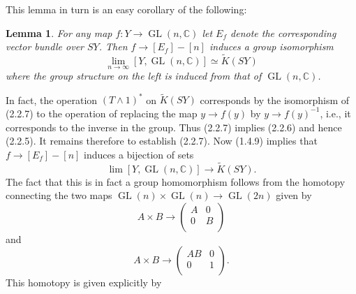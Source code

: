 \documentclass[leqno]{book}
\numberwithin{equation}{section}
\newtheorem{lemma}[theorem]{Lemma}
\theoremstyle{definition}
\begin{document}
            This lemma in turn is an easy corollary of the following:
            \begin{lemma}
              For any map $f:Y\to \operatorname{GL}(n,\mathbb{C})$ let $E_{f}$ denote the corresponding vector bundle over $SY$. Then $f\to [E_{f}]-[n]$ induces a group isomorphism
              \begin{equation*}
                \lim_{n \to \infty}[Y,\operatorname{GL}(n,\mathbb{C})]\simeq \tilde{K}(SY)
              \end{equation*}
              where the group structure on the left is induced from that of $\operatorname{GL}(n,\mathbb{C})$.
            \end{lemma}

            In fact, the operation $(T\wedge 1)^{*}$ on $\tilde{K}(SY)$ corresponds by the isomorphism of (2.2.7) to the operation of replacing the map $y\to f(y)$ by $y\to f(y)^{-1}$, i.e., it corresponds to the inverse in the group. Thus (2.2.7) implies (2.2.6) and hence (2.2.5). It remains therefore to establish (2.2.7). Now (1.4.9) implies that $f\to [E_{f}]-[n]$ induces a bijection of sets
            \begin{equation*}
              \lim [Y,\operatorname{GL}(n,\mathbb{C})]\to \tilde{K}(SY).
            \end{equation*}
            The fact that this is in fact a group homomorphism follows from the homotopy connecting the two maps $\operatorname{GL}(n)\times \operatorname{GL}(n)\to \operatorname{GL}(2n)$ given by
            \begin{equation*}
              A\times B\to \left( \begin{matrix}
                A&		0\\
                0&		B\\
              \end{matrix} \right) 
            \end{equation*}
            and
            \begin{equation*}
              A\times B\to 
              \left( \begin{matrix}
                AB&		0\\
                0&		1\\
              \end{matrix} \right) .
            \end{equation*}
            This homotopy is given explicitly by
\end{document}
